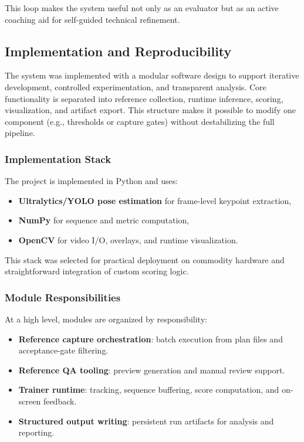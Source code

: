 \documentclass[12pt]{article}
\begin{document}
{This loop makes the system useful not only as an evaluator but as an active coaching aid for self-guided technical refinement.

\subsection{Implementation and Reproducibility}

The system was implemented with a modular software design to support iterative development, controlled experimentation, and transparent analysis. Core functionality is separated into reference collection, runtime inference, scoring, visualization, and artifact export. This structure makes it possible to modify one component (e.g., thresholds or capture gates) without destabilizing the full pipeline.

\subsubsection{Implementation Stack}

The project is implemented in Python and uses:

\begin{itemize}
    \item \textbf{Ultralytics/YOLO pose estimation} for frame-level keypoint extraction,
    \item \textbf{NumPy} for sequence and metric computation,
    \item \textbf{OpenCV} for video I/O, overlays, and runtime visualization.
\end{itemize}

This stack was selected for practical deployment on commodity hardware and straightforward integration of custom scoring logic.

\subsubsection{Module Responsibilities}

At a high level, modules are organized by responsibility:

\begin{itemize}
    \item \textbf{Reference capture orchestration}: batch execution from plan files and acceptance-gate filtering.
    \item \textbf{Reference QA tooling}: preview generation and manual review support.
    \item \textbf{Trainer runtime}: tracking, sequence buffering, score computation, and on-screen feedback.
    \item \textbf{Structured output writing}: persistent run artifacts for analysis and reporting.
\end{itemize}

}
\end{document}

